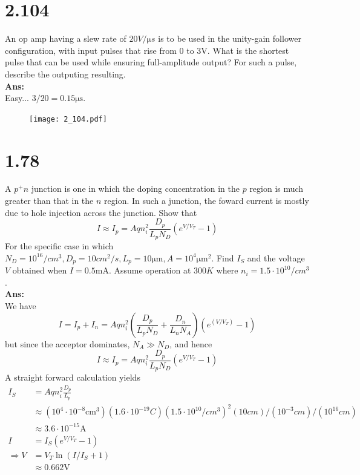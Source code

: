 \documentclass[12pt, a4paper]{article}
\newcommand{\samp}{\si{\ampere}}
\newcommand{\smia}{\si{\milli\ampere}}
\newcommand{\svol}{\si{\volt}}
\newcommand{\Ans}{{\\ \bf Ans:} \\}
\begin{document}
\section{2.104}
An op amp having a slew rate of $20 \si{V/\micro s}$ is to be used in the unity-gain follower configuration, with input pulses that rise from $0$ to $3\svol$. What is the shortest pulse that can be used while ensuring full-amplitude output? For such a pulse, describe the outputing resulting.
\Ans
Easy... $3 / 20 = 0.15 \si{\micro\second}$.
\begin{figure}[H]
  \centering
  \texttt{[image: 2\_104.pdf]}
\end{figure}

\section{1.78}
A $p^+n$ junction is one in which the doping concentration in the $p$ region is much greater than that in the $n$ region. In such a junction, the foward current is mostly due to hole injection across the junction. Show that
\[
  I \approx I_p = Aqn_i^2\frac{D_p}{L_p N_D} \left( e^{V/V_T} - 1 \right)
\]
For the specific case in which $N_D = 10^{16} \si{/cm^3}, D_p = 10 \si{cm^2/s}, L_p = 10 \si{\micro\meter}, A = 10^4 \si{\micro \meter^2}$. Find $I_S$ and the voltage $V$ obtained when $I = 0.5\smia$. Assume operation at $300 \si{K}$ where $n_i = 1.5 \cdot 10^{10} \si{/cm^3}$.
\Ans
We have
\[
  I = I_p + I_n = Aqn_i^2 \left( \frac{D_p}{L_p N_D} + \frac{D_n}{L_n N_A} \right) \left(e^{(V / V_T)} - 1 \right)
\]
but since the acceptor dominates, $N_A \gg N_D$, and hence
\[
  I \approx I_p = Aqn_i^2\frac{D_p}{L_p N_D} \left( e^{V/V_T} - 1 \right)
\]
A straight forward calculation yields
\begin{align*}
  I_S &= Aqn_i^2\frac{D_p}{L_p}  \\
  &\approx (10^4 \cdot 10^{-8} \si{\centi\meter^3})(1.6 \cdot 10^{-19} \si{C})(1.5\cdot10^{10} \si{/cm^3})^2 (10 \si{cm}) / (10^{-3} \si{cm}) / (10^{16} \si{cm}) \\
  &\approx 3.6 \cdot 10^{-15} \samp \\
  I &= I_S \left( e^{V/V_T} - 1\right) \\
  \Rightarrow V &= V_T \ln (I / I_S + 1) \\
  &\approx 0.662 \svol
\end{align*}
\end{document}
